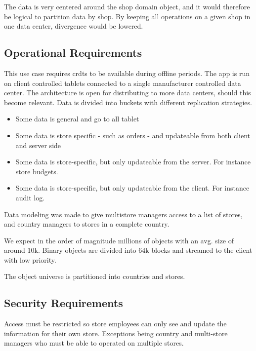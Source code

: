 \documentclass[11pt,a4paper]{report}
\begin{document}
The data is very centered around the shop domain object, and it would therefore be logical to partition data by shop. By keeping all operations on a given shop in one data center, divergence would be lowered.

\subsection{Operational Requirements}
This use case requires \glspl{crdt} to be available during offline periods.
The app is run on client controlled tablets connected to a single manufacturer controlled data center. The architecture is open for distributing to more data centers, should this become relevant.
Data is divided into buckets with different replication strategies. 
\begin{itemize}
\item Some data is general and go to all tablet
\item Some data is store specific - such as orders - and updateable from both client and server side
\item Some data is store-specific, but only updateable from the server. For instance store budgets.
\item Some data is store-specific, but only updateable from the client. For instance audit log.
\end{itemize}

Data modeling was made to give multistore managers access to a list of stores, and country managers to stores in a complete country.

We expect in the order of magnitude millions of objects with an avg. size of around 10k. Binary objects are divided into 64k blocks and streamed to the client with low priority.

The object universe is partitioned  into countries and stores.

\subsection{Security Requirements}
Access must be restricted so store employees can only see and update the information for their own store. Exceptions being country and multi-store managers who must be able to operated on multiple stores.
\end{document}
